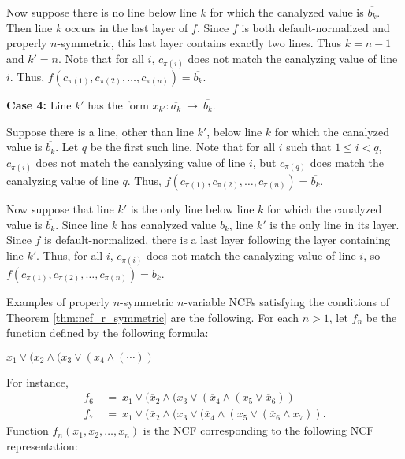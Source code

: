 Now suppose there is no line below line $k$ for which the canalyzed
value is $\overline{b_k}$.  
Then line $k$ occurs in the last layer of $f$.  
Since $f$ is both default-normalized and properly $n$-symmetric,
this last layer contains exactly two lines.  Thus $k = n-1$ and $k'
= n$.  Note that for all $i$, $c_{\pi(i)}$ does not match the
canalyzing value of line $i$.  Thus, $f(c_{\pi(1)}, c_{\pi(2)},
\ldots, c_{\pi(n)}) = \overline{b_k}$.

\medskip

\noindent
{\bf Case 4:} Line $k'$ has the form $x_{k'} : \overline{a_k} ~\longrightarrow~ 
              \overline{b_k}$. 

\smallskip

Suppose there is a line, other than line $k'$, below line $k$ for
which the canalyzed value is $\overline{b_k}$.  Let $q$ be the
first such line.  Note that for all $i$ such that $1 \leq i < q$,
$c_{\pi(i)}$ does not match the canalyzing value of line $i$, but
$c_{\pi(q)}$ does match the canalyzing value of line $q$.  Thus,
$f(c_{\pi(1)}, c_{\pi(2)}, \ldots, c_{\pi(n)}) = \overline{b_k}$.

Now suppose that line $k'$ is the only line below line $k$ for which
the canalyzed value is $\overline{b_k}$.  Since line $k$ has
canalyzed value $b_k$, line $k'$ is the only line in its layer.
Since $f$ is default-normalized, there is a last layer following the layer
containing line $k'$.  Thus, for all $i$, $c_{\pi(i)}$ does not
match the canalyzing value of line $i$, so $f(c_{\pi(1)}, c_{\pi(2)},
\ldots, c_{\pi(n)}) = \overline{b_k}$.  \QED

\medskip

\noindent
Examples of properly $n$-symmetric $n$-variable NCFs satisfying the
conditions of Theorem \ref{thm:ncf_r_symmetric} are the following.
For each $n > 1$, let $f_n$ be the function defined by the following
formula:

\smallskip

\hspace*{0.5in} $x_1 \vee (\overline{x}_2 \wedge ( x_3 \vee (\overline{x}_4 \wedge (\cdots ))$

\smallskip

\noindent
For instance,
\begin{align*}
f_6 &~=~  x_1 \vee (\overline{x}_2 \wedge (x_3 \vee (\overline{x}_4 \wedge 
      (x_5 \vee \overline{x}_6)) \\
f_7 &~=~  x_1 \vee (\overline{x}_2 \wedge (x_3 \vee (\overline{x}_4 \wedge (x_5 
          \vee (\overline{x}_6 \wedge  x_7)).
\end{align*}
Function $f_n(x_1, x_2, \ldots, x_n)$ is the NCF corresponding to
the following NCF representation:

